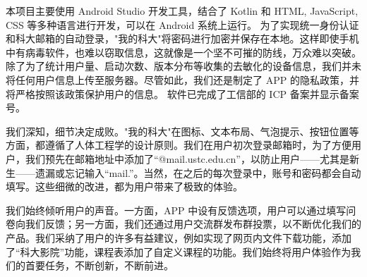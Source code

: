 本项目主要使用 Android Studio 开发工具，结合了 Kotlin 和 HTML, JavaScript, CSS 等多种语言进行开发，可以在 Android 系统上运行。
为了实现统一身份认证和科大邮箱的自动登录，"我的科大"将密码进行加密并保存在本地。这样即使手机中有病毒软件，也难以窃取信息，这就像是一个坚不可摧的防线，万众难以突破。除了为了统计用户量、启动次数、版本分布等收集的去敏化的设备信息，我们并未将任何用户信息上传至服务器。尽管如此，我们还是制定了 APP 的隐私政策，并将严格按照该政策保护用户的信息。
软件已完成了工信部的 ICP 备案并显示备案号。

我们深知，细节决定成败。"我的科大"在图标、文本布局、气泡提示、按钮位置等方面，都遵循了人体工程学的设计原则。我们在用户初次登录邮箱时，为了方便用户，我们预先在邮箱地址中添加了“@mail.ustc.edu.cn”，以防止用户——尤其是新生——遗漏或忘记输入“mail.”。当然，在之后的每次登录中，账号和密码都会自动填写。这些细微的改进，都为用户带来了极致的体验。

我们始终倾听用户的声音。一方面，APP 中设有反馈选项，用户可以通过填写问卷向我们反馈；另一方面，我们还通过用户交流群发布群投票，以不断优化我们的产品。我们采纳了用户的许多有益建议，例如实现了网页内文件下载功能，添加了“科大影院”功能，课程表添加了自定义课程的功能。我们始终将用户体验作为我们的首要任务，不断创新，不断前进。